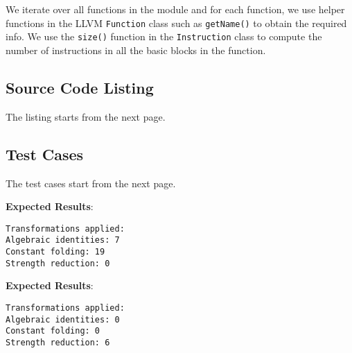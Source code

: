 We iterate over all functions in the module and for each function, we use helper functions in the
LLVM \texttt{Function} class such as \texttt{getName()} to obtain the required info.
We use the \texttt{size()} function in the \texttt{Instruction} class to compute the number of
instructions in all the basic blocks in the function.

\subsection{Source Code Listing}

The listing starts from the next page.



\subsection{Test Cases}

The test cases start from the next page.



\textbf{Expected Results}:\\

\begin{verbatim}
Transformations applied:
Algebraic identities: 7
Constant folding: 19
Strength reduction: 0
\end{verbatim}



\textbf{Expected Results}:\\

\begin{verbatim}
Transformations applied:
Algebraic identities: 0
Constant folding: 0
Strength reduction: 6
\end{verbatim}


